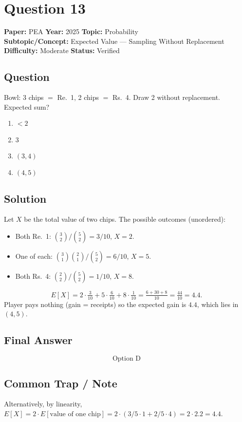 \documentclass[11pt]{article}
\begin{document}
\section*{Question 13}
\textbf{Paper:} PEA \quad \textbf{Year:} 2025 \quad \textbf{Topic:} Probability \\
\textbf{Subtopic/Concept:} Expected Value --- Sampling Without Replacement \\
\textbf{Difficulty:} Moderate \quad \textbf{Status:} Verified

\subsection*{Question}
Bowl: 3 chips $=$ Re.\ 1, 2 chips $=$ Rs.\ 4. Draw 2 without replacement. Expected sum?
\begin{enumerate}[label=(\Alph*)]
\item $<2$ \item $3$ \item $(3,4)$ \item $(4,5)$
\end{enumerate}

\subsection*{Solution}
Let $X$ be the total value of two chips. The possible outcomes (unordered):
\begin{itemize}[leftmargin=*]
\item Both Re.\ 1: $\binom{3}{2}/\binom{5}{2} = 3/10$, $X = 2$.
\item One of each: $\binom{3}{1}\binom{2}{1}/\binom{5}{2} = 6/10$, $X = 5$.
\item Both Rs.\ 4: $\binom{2}{2}/\binom{5}{2} = 1/10$, $X = 8$.
\end{itemize}
\[
E[X] = 2 \cdot \tfrac{3}{10} + 5 \cdot \tfrac{6}{10} + 8 \cdot \tfrac{1}{10} = \tfrac{6 + 30 + 8}{10} = \tfrac{44}{10} = 4.4.
\]
Player pays nothing (gain = receipts) so the expected gain is $4.4$, which lies in $(4,5)$.

\subsection*{Final Answer}
\[
\boxed{\text{Option D}}
\]

\subsection*{Common Trap / Note}
Alternatively, by linearity, $E[X] = 2 \cdot E[\text{value of one chip}] = 2 \cdot (3/5 \cdot 1 + 2/5 \cdot 4) = 2 \cdot 2.2 = 4.4$.
\end{document}
